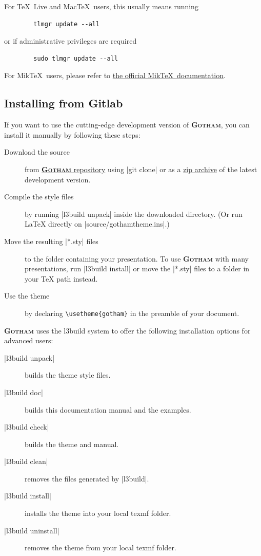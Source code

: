 \documentclass{l3doc}
\providecommand{\themename}{\textbf{\textsc{Gotham}}\xspace}
\begin{document}
	For \TeX\ Live and Mac\TeX\ users, this usually means running
	\begin{lstlisting}
		tlmgr update --all
	\end{lstlisting}
	or if administrative privileges are required
	\begin{lstlisting}
		sudo tlmgr update --all
	\end{lstlisting}

	For Mik\TeX\ users, please refer to \href{https://miktex.org/howto/update-miktex}{the official Mik\TeX\ documentation}.


\subsection{Installing from Gitlab}
	If you want to use the cutting-edge development version of \themename, you can install it manually by following these steps:
	\begin{description}
		\item[Download the source] from
			\href{https://gitlab.com/RomainNOEL/beamertheme-gotham}{\themename repository}
			using |git clone| or as a 
			\href{https://gitlab.com/RomainNOEL/beamertheme-gotham/-/archive/master/beamertheme-gotham-master.zip}{zip archive} 
			of the latest development version.
		\item[Compile the style files] by running |l3build unpack| inside the downloaded	directory. 
			(Or run \LaTeX{} directly on |source/gothamtheme.ins|.)
		\item[Move the resulting |*.sty| files] to the folder containing your presentation. 
			To use \themename with many presentations, run
			|l3build install| or move the |*.sty| files to a folder in your \TeX{} path instead.
		\item[Use the theme] by declaring \lstinline|\usetheme{gotham}| in the preamble of your document.
	\end{description}

	\themename uses the l3build system to offer the following installation options for advanced users:
	\begin{description}
		\item[|l3build unpack|] builds the theme style files.
		\item[|l3build doc|] builds this documentation manual and the examples.
		\item[|l3build check|] builds the theme and manual.
		\item[|l3build clean|] removes the files generated by |l3build|.
		\item[|l3build install|] installs the theme into your local texmf folder.
		\item[|l3build uninstall|] removes the theme from your local texmf folder.
	\end{description}
\end{document}
